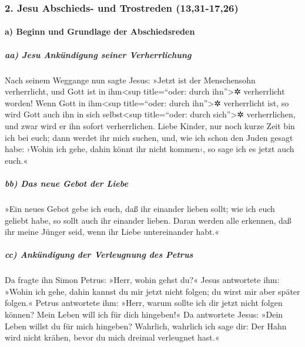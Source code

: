 \hypertarget{jesu-abschieds--und-trostreden-1331-1726}{%
\subsubsection{2. Jesu Abschieds- und Trostreden
(13,31-17,26)}\label{jesu-abschieds--und-trostreden-1331-1726}}

\hypertarget{a-beginn-und-grundlage-der-abschiedsreden}{%
\paragraph{a) Beginn und Grundlage der
Abschiedsreden}\label{a-beginn-und-grundlage-der-abschiedsreden}}

\hypertarget{aa-jesu-ankuxfcndigung-seiner-verherrlichung}{%
\subparagraph{aa) Jesu Ankündigung seiner
Verherrlichung}\label{aa-jesu-ankuxfcndigung-seiner-verherrlichung}}

 Nach seinem Weggange nun sagte Jesus: »Jetzt ist der
Menschensohn verherrlicht, und Gott ist in ihm\textless sup
title=``oder: durch ihn''\textgreater✲ verherrlicht worden!
 Wenn Gott in ihm\textless sup title=``oder: durch
ihn''\textgreater✲ verherrlicht ist, so wird Gott auch ihn in sich
selbst\textless sup title=``oder: durch sich''\textgreater✲
verherrlichen, und zwar wird er ihn sofort verherrlichen.
 Liebe Kinder, nur noch kurze Zeit bin ich bei euch; dann
werdet ihr mich suchen, und, wie ich schon den Juden gesagt habe: ›Wohin
ich gehe, dahin könnt ihr nicht kommen‹, so sage ich es jetzt auch
euch.«

\hypertarget{bb-das-neue-gebot-der-liebe}{%
\subparagraph{bb) Das neue Gebot der
Liebe}\label{bb-das-neue-gebot-der-liebe}}

 »Ein neues Gebot gebe ich euch, daß ihr einander lieben
sollt; wie ich euch geliebt habe, so sollt auch ihr einander lieben.
 Daran werden alle erkennen, daß ihr meine Jünger seid,
wenn ihr Liebe untereinander habt.«

\hypertarget{cc-ankuxfcndigung-der-verleugnung-des-petrus}{%
\subparagraph{cc) Ankündigung der Verleugnung des
Petrus}\label{cc-ankuxfcndigung-der-verleugnung-des-petrus}}

 Da fragte ihn Simon Petrus: »Herr, wohin gehst du?«
Jesus antwortete ihm: »Wohin ich gehe, dahin kannst du mir jetzt nicht
folgen; du wirst mir aber später folgen.« Petrus antwortete ihm:
 »Herr, warum sollte ich dir jetzt nicht folgen können?
Mein Leben will ich für dich hingeben!«  Da antwortete
Jesus: »Dein Leben willst du für mich hingeben? Wahrlich, wahrlich ich
sage dir: Der Hahn wird nicht krähen, bevor du mich dreimal verleugnet
hast.«

